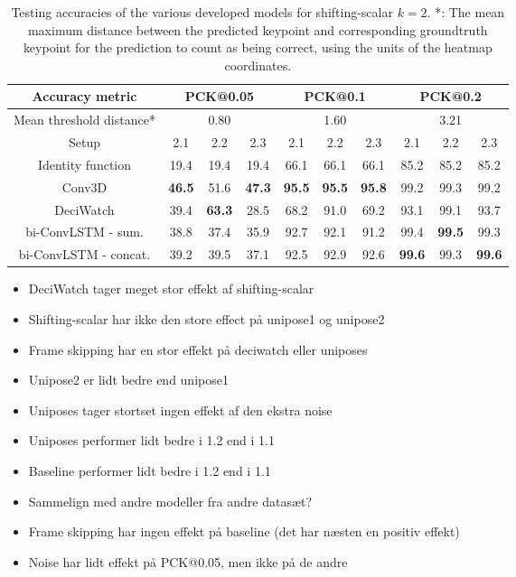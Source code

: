 \documentclass[./main.tex]{subfiles}
\begin{document}
\begin{table}[htbp]
    \begin{tabular}{c||ccc|ccc|ccc}
        \hline
        Accuracy metric & \multicolumn{3}{c}{PCK@0.05} & \multicolumn{3}{c}{PCK@0.1} & \multicolumn{3}{c}{PCK@0.2} \\
        \hline
        Mean threshold distance* & \multicolumn{3}{c}{0.80} & \multicolumn{3}{c}{1.60} & \multicolumn{3}{c}{3.21} \\
        \hline
        Setup & 2.1 & 2.2 & 2.3 & 2.1 & 2.2 & 2.3 & 2.1 & 2.2 & 2.3 \\
        \hline
        \hline
        Identity function & 19.4 & 19.4 & 19.4 & 66.1 & 66.1 & 66.1 & 85.2 & 85.2 & 85.2 \\
        Conv3D & \textbf{46.5} & 51.6 & \textbf{47.3} & \textbf{95.5} & \textbf{95.5} & \textbf{95.8} & 99.2 & 99.3 & 99.2 \\
        DeciWatch & 39.4 & \textbf{63.3} & 28.5 & 68.2 & 91.0 & 69.2 & 93.1 & 99.1 & 93.7 \\
        bi-ConvLSTM - sum. & 38.8 & 37.4 & 35.9 & 92.7 & 92.1 & 91.2 & 99.4 & \textbf{99.5} & 99.3 \\
        bi-ConvLSTM - concat. & 39.2 & 39.5 & 37.1 & 92.5 & 92.9 & 92.6 & \textbf{99.6} & 99.3 & \textbf{99.6} \\
        \hline
    \end{tabular}
    \caption{Testing accuracies of the various developed models for shifting-scalar $k = 2$. *: The mean maximum distance between the predicted keypoint and corresponding groundtruth keypoint for the prediction to count as being correct, using the units of the heatmap coordinates.}
    \label{tab:finetune_test_accs_2}
\end{table}

\begin{itemize}
    \item DeciWatch tager meget stor effekt af shifting-scalar
    \item Shifting-scalar har ikke den store effect på unipose1 og unipose2
    \item Frame skipping har en stor effekt på deciwatch eller uniposes
    \item Unipose2 er lidt bedre end unipose1
    \item Uniposes tager stortset ingen effekt af den ekstra noise
    \item Uniposes performer lidt bedre i 1.2 end i 1.1
    \item Baseline performer lidt bedre i 1.2 end i 1.1
    \item Sammelign med andre modeller fra andre datasæt?
    \item Frame skipping har ingen effekt på baseline (det har næsten en positiv effekt)
    \item Noise har lidt effekt på PCK@0.05, men ikke på de andre
\end{itemize}
\end{document}
